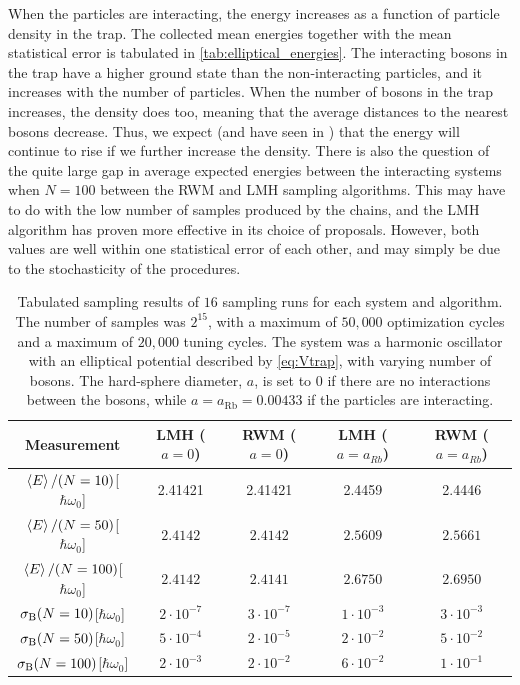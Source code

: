 When the particles are interacting, the energy increases as a function of particle density in the trap. The collected mean energies together with the mean statistical error is tabulated in \autoref{tab:elliptical_energies}. The interacting bosons in the trap have a higher ground state than the non-interacting particles, and it increases with the number of particles. When the number of bosons in the trap increases, the density does too, meaning that the average distances to the nearest bosons decrease. Thus, we expect (and have seen in \citep{DuBois2001}) that the energy will continue to rise if we further increase the density. There is also the question of the quite large gap in average expected energies between the interacting systems when $N=100$ between the RWM and LMH sampling algorithms. This may have to do with the low number of samples produced by the chains, and the LMH algorithm has proven more effective in its choice of proposals. However, both values are well within one statistical error of each other, and may simply be due to the stochasticity of the procedures. 


\begin{table}[h]
\caption{Tabulated sampling results of $16$ sampling runs for each system and algorithm. The number of samples was $2^{15}$, with a maximum of $50,000$ optimization cycles and a maximum of $20,000$ tuning cycles. The system was a harmonic oscillator with an elliptical potential described by \autoref{eq:Vtrap}, with varying number of bosons. The hard-sphere diameter, $a$, is set to $0$ if there are no interactions between the bosons, while $a=a_{\mathrm{Rb}}=0.00433$ if the particles are interacting.}
\centering
{}
\begin{tabular}{ccccc}
\hline\hline
Measurement & LMH ($a=0$) & RWM ($a=0$) & LMH ($a=a_{Rb}$) & RWM ($a=a_{Rb}$)
\\
\hline \hline
$\expval{E}/(N=10)$[$\hbar\omega_0$] & 2.41421 & 2.41421 & 2.4459 & 2.4446  
\\
$\expval{E}/(N=50)$[$\hbar\omega_0$] & $2.4142$ & $2.4142$ & $2.5609$ & $2.5661$ 
\\
$\expval{E}/(N=100)$[$\hbar\omega_0$] & $2.4142$ & $2.4141$ & $2.6750$ & $2.6950$ 
\\
$\sigma_{\mathrm{B}}\qty(N=10)$[$\hbar\omega_0$] & $2\cdot10^{-7}$ & $3\cdot10^{-7}$ & $1\cdot10^{-3}$ & $3\cdot10^{-3}$ 
\\
$\sigma_{\mathrm{B}}\qty(N=50)$[$\hbar\omega_0$] & $5\cdot10^{-4}$ & $2\cdot10^{-5}$ & $2\cdot10^{-2}$ & $5\cdot10^{-2}$
\\
$\sigma_{\mathrm{B}}\qty(N=100)$[$\hbar\omega_0$] & $2\cdot10^{-3}$ & $2\cdot10^{-2}$ & $6\cdot10^{-2}$ & $1\cdot10^{-1}$
\\
\hline\hline
\end{tabular}
\label{tab:elliptical_energies}
\end{table}

